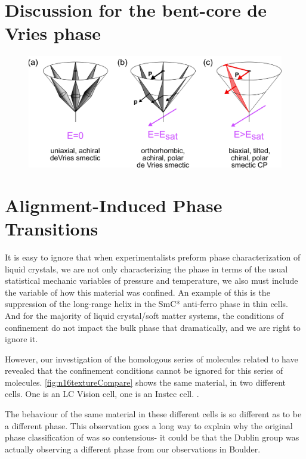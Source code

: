 \documentclass[aagreenthesis]{subfiles}
\begin{document}
\section{Discussion for the bent-core de Vries phase}
\begin{figure}[h!]
    \centering
    \includegraphics{figs/pal30/deVries/dvAlign.png}
    \caption{\label{}}
\end{figure}

\section{Alignment-Induced Phase Transitions}
It is easy to ignore that when experimentalists preform phase characterization
of liquid crystals, we are not only characterizing the phase in terms of the
usual statistical mechanic variables of pressure and temperature, we also must
include the variable of how this material was confined. An example of this is
the suppression of the long-range helix in the SmC* anti-ferro phase in thin cells. And for the majority of liquid crystal/soft
matter systems, the conditions of confinement do not impact the bulk phase that
dramatically, and we are right to ignore it.

However, our investigation of the homologous series of molecules related to
\nfour{} have revealed that the confinement conditions cannot be ignored for
this series of molecules. \autoref{fig:n16textureCompare} shows the same
material, \nsix{} in two different cells. One is an LC Vision cell, one is an
Instec cell.
.

The behaviour of the same material in these different cells is so different as
to be a different phase. This observation goes a long way to explain why the
original phase classification of \nfour{} was so contensious- it could be that
the Dublin group was actually observing a different phase from our observations
in Boulder.
\end{document}
